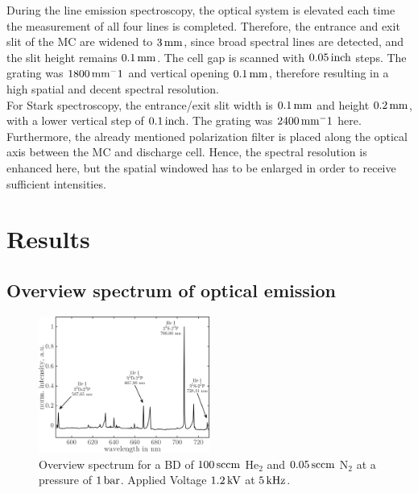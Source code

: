 \documentclass[a4paper,10pt,twoside]{article}
\begin{document}
			During the line emission spectroscopy, the optical system is elevated each time the measurement of all four lines is completed. Therefore, the entrance and exit slit of the MC are widened to $\unit[3]{mm}$, since broad spectral lines are detected, and the slit height remains $\unit[0.1]{mm}$. The cell gap is scanned with $\unit[0.05]{inch}$ steps. The grating was $\unit[1800]{mm^-1}$ and vertical opening $\unit[0.1]{mm}$, therefore resulting in a high spatial and decent spectral resolution.\\
			For Stark spectroscopy, the entrance/exit slit width is $\unit[0.1]{mm}$ and height $\unit[0.2]{mm}$, with a lower vertical step of $\unit[0.1]{inch}$. The grating was $\unit[2400]{mm^-1}$ here. Furthermore, the already mentioned polarization filter is placed along the optical axis between the MC and discharge cell. Hence, the spectral resolution is enhanced here, but the spatial windowed has to be enlarged in order to receive sufficient intensities.

	\section{Results}

		\subsection{Overview spectrum of optical \newline emission}\label{subsec:overview}
			
				\begin{figure}[b!]
					\centering
					\hspace{-0.5cm}\includegraphics[width=0.5\textwidth]{figures/results/int_spectrum}
					\caption{Overview spectrum for a BD of $\unit[100]{sccm}$ He$_2$ and $\unit[0.05]{sccm}$ N$_2$ at a pressure of $\unit[1]{bar}$. Applied Voltage $\unit[1.2]{kV}$ at $\unit[5]{kHz}$.}
					\label{img:intspec}
				\end{figure}
		
\end{document}
